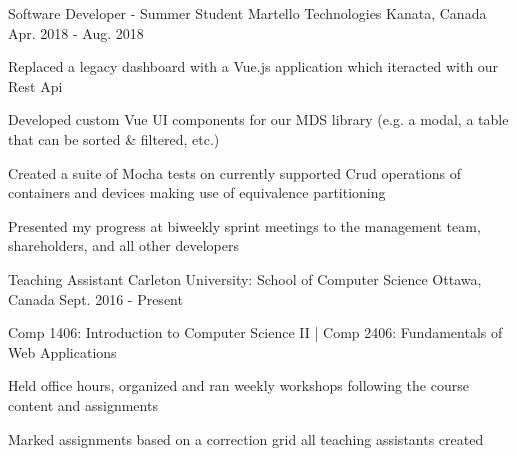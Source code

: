 
\begin{cventries}

  \cventry
    {Software Developer - Summer Student} %
    {Martello Technologies} %
    {Kanata, Canada} %
    {Apr. 2018 - Aug. 2018} %
    {
      \begin{cvitems} %
        \item Replaced a legacy dashboard with a Vue.js application which iteracted with our Rest Api
        \item Developed custom Vue UI components for our MDS library (e.g. a modal, a table that can be sorted \& filtered, etc.)
        \item Created a suite of Mocha tests on currently supported Crud operations of containers and devices making use of equivalence partitioning
        \item Presented my progress at biweekly sprint meetings to the management team, shareholders, and all other developers
      \end{cvitems}
    }

  \cventry
    {Teaching Assistant} %
    {Carleton University: School of Computer Science} %
    {Ottawa, Canada} %
    {Sept. 2016 - Present} %
    {
      \begin{cvitems} %
      \item Comp 1406: Introduction to Computer Science II {\color{awesome}|} Comp 2406: Fundamentals of Web Applications
      \item Held office hours, organized and ran weekly workshops following the course content and assignments
      \item Marked assignments based on a correction grid all teaching assistants created
      \end{cvitems}
    }

\end{cventries}
